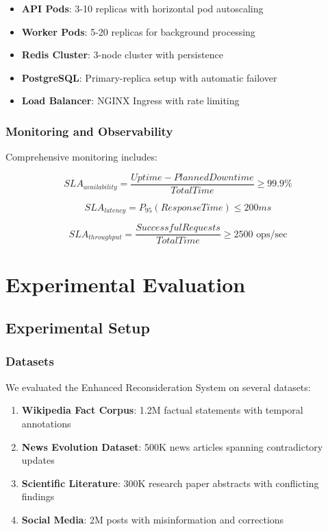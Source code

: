 \documentclass[12pt,a4paper]{article}
\begin{document}
\begin{itemize}
\item \textbf{API Pods}: 3-10 replicas with horizontal pod autoscaling
\item \textbf{Worker Pods}: 5-20 replicas for background processing
\item \textbf{Redis Cluster}: 3-node cluster with persistence
\item \textbf{PostgreSQL}: Primary-replica setup with automatic failover
\item \textbf{Load Balancer}: NGINX Ingress with rate limiting
\end{itemize}

\subsubsection{Monitoring and Observability}

Comprehensive monitoring includes:

\begin{equation}
SLA_{availability} = \frac{Uptime - PlannedDowntime}{TotalTime} \geq 99.9\%
\end{equation}

\begin{equation}
SLA_{latency} = P_{95}(ResponseTime) \leq 200ms
\end{equation}

\begin{equation}
SLA_{throughput} = \frac{SuccessfulRequests}{TotalTime} \geq 2500 \text{ ops/sec}
\end{equation}

\section{Experimental Evaluation}

\subsection{Experimental Setup}

\subsubsection{Datasets}

We evaluated the Enhanced Reconsideration System on several datasets:

\begin{enumerate}
\item \textbf{Wikipedia Fact Corpus}: 1.2M factual statements with temporal annotations
\item \textbf{News Evolution Dataset}: 500K news articles spanning contradictory updates
\item \textbf{Scientific Literature}: 300K research paper abstracts with conflicting findings
\item \textbf{Social Media}: 2M posts with misinformation and corrections
\end{enumerate}
\end{document}
